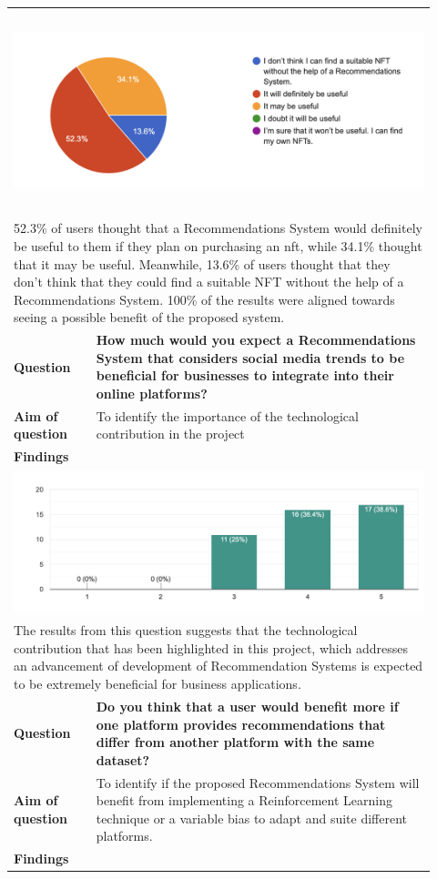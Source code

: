 \begin{longtable}{|p{0.18\linewidth}|p{0.74\linewidth}|}
\multicolumn{2}{|l|}{
\centering
\includegraphics[height=2.3in]{images/SRS/survey/survey-4.png}
} \\ 
\multicolumn{2}{|l|}{
\parbox{\textwidth}{
52.3\% of users thought that a Recommendations System would definitely be useful to them if they plan on purchasing an \gls{nft}, while 34.1\% thought that it may be useful. Meanwhile, 13.6\% of users thought that they don't think that they could find a suitable NFT without the help of a Recommendations System. 100\% of the results were aligned towards seeing a possible benefit of the proposed system.
}} \\
\hline
\textbf{Question} & \textbf{How much would you expect a Recommendations System that considers social media trends to be beneficial for businesses to integrate into their online platforms?} \\
\hline
\textbf{Aim of question} & To identify the importance of the technological contribution in the project \\
\hline
\multicolumn{2}{|l|}{\textbf{Findings}} \\

\multicolumn{2}{|l|}{
\centering
\includegraphics[width=\textwidth]{images/SRS/survey/survey-5.png}
} \\ 
\multicolumn{2}{|l|}{
\parbox{\textwidth}{
The results from this question suggests that the technological contribution that has been highlighted in this project, which addresses an advancement of development of Recommendation Systems is expected to be extremely beneficial for business applications.
}} \\
\hline
\textbf{Question} & \textbf{Do you think that a user would benefit more if one platform provides recommendations that differ from another platform with the same dataset?} \\
\hline
\textbf{Aim of question} & To identify if the proposed Recommendations System will benefit from implementing a Reinforcement Learning technique or a variable bias to adapt and suite different platforms. \\
\hline
\multicolumn{2}{|l|}{\textbf{Findings}} \\


\end{longtable}
